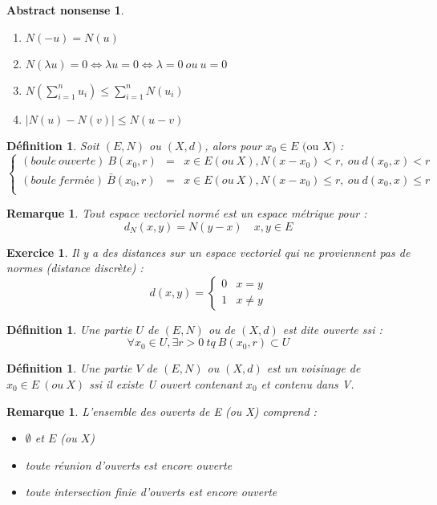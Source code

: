 \documentclass[a4paper, oneside]{report}
\theoremstyle{break}
\newtheorem{defi}[thm]{Définition}
\newtheorem{remar}[thm]{Remarque}
\newtheorem{exo}[thm]{Exercice}
\newtheorem*{absnon}{Abstract nonsense}
\newcommand{\ev}{espace vectoriel }
\newcommand{\evn}{espace vectoriel normé }
\begin{document}
\begin{absnon}
\begin{enumerate}
\item $N(-u)=N(u)$
\item $N(\lambda u)=0 \Leftrightarrow \lambda u =0 \Leftrightarrow \lambda =0~ou~u=0$
\item $N(\sum_{i=1}^{n}u_i) \leq \sum_{i=1}^{n}N(u_i)$
\item $|N(u)-N(v)|\leq N(u-v)$
\end{enumerate}
\end{absnon}


\begin{defi}
Soit $(E,N)$ ou $(X,d)$, alors pour $x_0\in E \text{ (ou }X)$ :
$$\left\{\begin{array}{lll}
(boule~ouverte)~B(x_0,r)&=& x\in E(ou~X), N(x-x_0)<r,~ou~d(x_0,x)<r\\
(boule~fermée)~\bar{B}(x_0,r)&=&x\in E(ou~X), N(x-x_0)\leq r,~ou~d(x_0,x)\leq r\\
\end{array}\right.$$
\end{defi}

\begin{remar}
Tout \evn est un espace métrique pour :
$$d_N(x,y)=N(y-x)\hspace{1em}x,y\in E$$
\end{remar}

\begin{exo}
Il y a des distances sur un \ev qui ne proviennent pas de normes (distance discrète) :
$$d(x,y)=\left\{\begin{array}{ll}
0 & x=y\\
1 & x\neq y
\end{array}\right.$$
\end{exo}

\begin{defi}
Une partie $U$ de $(E,N)$ ou de $(X, d)$ est dite ouverte ssi :
$$\forall x_0\in U, \exists r>0~tq~B(x_0,r)\subset U$$
\end{defi}

\begin{defi}
Une partie $V$ de $(E,N)$ ou $(X, d)$ est un voisinage de $x_0\in E~(ou~X)$ ssi il existe U ouvert contenant $x_0$ et contenu dans V.
\end{defi}

\begin{remar}
L'ensemble des ouverts de E (ou X) comprend :
\begin{itemize}
\item $\emptyset$ et $E$ (ou $X$)
\item toute réunion d'ouverts est encore ouverte
\item toute intersection finie d'ouverts est encore ouverte
\end{itemize}
\end{remar}
\end{document}
